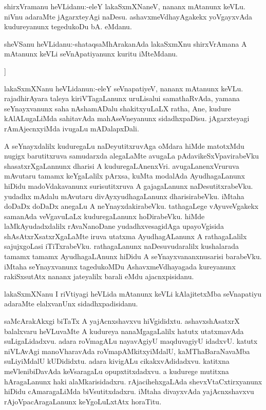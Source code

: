 \documentclass{article}
\begin{document}
\begin{mn}%
shirxVramanu heVLidanu:-eleY lakaSxmXNaneV, nananx mAtanunx keVLu. niVnu adaraMte 
jAgarxteyAgi naDesu. ashavxmeVdhayAgakekx yoVgayxvAda kudureyanunx tegedukoDu bA. eMdanu.
\end{mn}

\begin{mn}%
sheVSanu heVLidanu:-shataqsaMhArakanAda lakaSxmXnu shirxVrAmana A mAtanunx keVLi 
seVnApatiyanunx kuritu iMteMdanu.
\end{mn}]

\begin{mn}%
lakaSxmXNanu heVLidanun:-eleY seVnapatiyeV, nananx mAtanunx keVLu. rajadhirAyara taleya 
kiriVTagaLanunx uruLisalui samathaRvAda, yamana seYnayxvanunx saha nAshamADalu 
shakitxyuLaLX ratha, Ane, kudure kAlALugaLiMda sahitavAda mahAseVneyanunx sidadhxpaDisu. 
jAgarxteyagi rAmAjecnxyiMda ivugaLu mADalapxDali.
\end{mn}

\begin{mn}%
A seYnayxdalilx kuduregaLu naDeyutitxruvAga oMdara hiMde matotxMdu nugigx barutitxruva 
samudarxda alegaLaMte avugaLa pAdavikeSxVpavirabeVku shasatxrXgaLannunx dharisi A 
kuduregaLAnenxVri. avugaLanenxVruruva mAvutaru tamamx keYgaLalilx pArxsa, kuMta modalAda 
AyudhagaLanunx  hiDidu madoVdakavanunx surisutitxruva A gajagaLanunx naDesutitxrabeVku. 
yudadhx mAdalu mAvutaru divAyxyudhagaLanunx dharisirabeVku. iMtaha doDaDx doDaDx anegaLu A 
neYnayxdakirabeVku. tathagaLege vAyuveVgakekx samanAda veVgavuLaLx kuduregaLanunx 
hoDirabeVku. hiMde laMkAyudadxdalilx rAvaNanoDane yudadhxvesagidAga upayoVgisida 
shAsAtxrXsatxrXgaLaMte iruva utatxma AyudhagALanunx A rathagaLalilx sajujxgoLasi 
iTiTxrabeVku. rathagaLanunx naDesuvudaralilx kushalarada tamamx tamamx AyudhagaLAnunx 
hiDidu A seYnayxvananxnusarisi barabeVku. iMtaha seYnayxvanunx tagedukoMDu 
AshavxmeVdhayagada kureyanunx rakiSxsutAtx nananx jateyalilx barali eMdu ajacnxpisidanu.
\end{mn}

\begin{mn}%
lakaSxmXNanu I riVtiyagi heVLida mAtanunx keVLi kAlajitetxMba seVnapatiyu adaraMte 
elalxvanUnx sidadhxpadisidanu.
\end{mn}

\begin{mn}%
saMcArakAkxgi biTaTx A yajAcnxshavxvu hiVgididxtu. ashavxshAsatxrX balalxvaru heVLuvaMte A 
kudureya nanaMgagaLalilx hatutx utatxmavAda suLigaLidadxvu. adara roVmagALu nayavAgiyU 
maqduvagiyU idadxvU. katutx niVLAvAgi manoVharavAda roVmapAMkitxyiMdalU, kaMThaBaraNavaMba
suLiyiMdalU kUDididxtu. adara kivigALu cikakxvAdidadxvu. katitxna meVlenibiDavAda 
keVsaragaLu opupxtitxdadxvu. a kudurege mutitxna hAragaLanunx haki alaMkarisidadxru. 
rAjacihehxgaLAda shevxVtaCxtirxyanunx hiDidu cAmaragaLiMda biVsutitxdadxru. iMtaha 
divayxvAda yajAcnxshavxvu rAjoVpacAragaLanunx keYgoLuLxtAtx horaTitu.
\end{mn}
\end{document}

